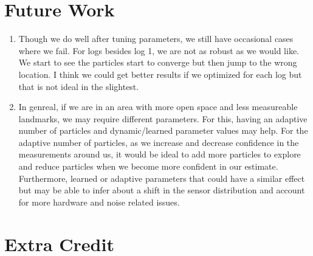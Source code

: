 \documentclass[12pt, a4paper]{article}
\begin{document}
\section{Future Work}
\begin{enumerate}
  \item Though we do well after tuning parameters, we still have occasional cases where we fail. For logs besides log 1, we are not as robust as we would like. We start to see the particles start to converge but then jump to the wrong location. I think we could get better results if we optimized for each log but that is not ideal in the slightest.
  \item In genreal, if we are in an area with more open space and less measureable landmarks, we may require different parameters. For this, having an adaptive number of particles and dynamic/learned parameter values may help. For the adaptive number of particles, as we increase and decrease confidence in the measurements around us, it would be ideal to add more particles to explore and reduce particles when we become more confident in our estimate. Furthermore, learned or adaptive parameters that could have a similar effect but may be able to infer about a shift in the sensor distribution and account for more hardware and noise related issues.
\end{enumerate}




\section{Extra Credit}
\end{document}
